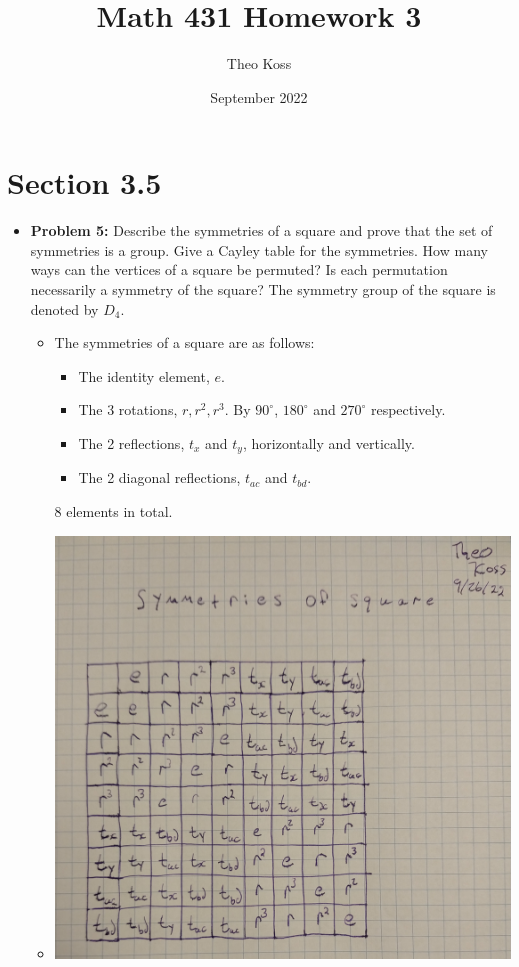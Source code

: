 \documentclass[a4paper,12pt]{extarticle}
\title{Math 431 Homework 3}
\author{Theo Koss}
\date{September 2022}
\theoremstyle{definition}
\begin{document}
\maketitle
\section*{Section 3.5}
\begin{itemize}
    \item \textbf{Problem 5:} Describe the symmetries of a square and prove that the set of symmetries is a group. Give a Cayley table for the symmetries. How many ways can the vertices of a square be permuted? Is each permutation necessarily a symmetry of the square? The symmetry group of the square is denoted by $D_4$.\begin{itemize}
    \item The symmetries of a square are as follows:\begin{itemize}
            \item The identity element, $e$.
            \item The 3 rotations, $r,r^2,r^3$. By $90^{\circ}$, $180^{\circ}$ and $270^{\circ}$ respectively.
            \item The 2 reflections, $t_x$ and $t_y$, horizontally and vertically.
            \item The 2 diagonal reflections, $t_{ac}$ and $t_{bd}$.
    \end{itemize} 8 elements in total.
    \item \begin{minipage}{\linewidth}
\includegraphics[width=\linewidth]{Photos/SymSquare.jpg}

\end{minipage}
\end{itemize}
\end{itemize}
\end{document}
